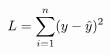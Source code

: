 \documentclass[preview]{standalone}
\begin{document}
\begin{align*}
\special{dvisvgm:raw <g id='unique000'>}L=\sum^{n}_{i=1}(y-\hat{y})^2\special{dvisvgm:raw </g>}
\end{align*}
\end{document}
